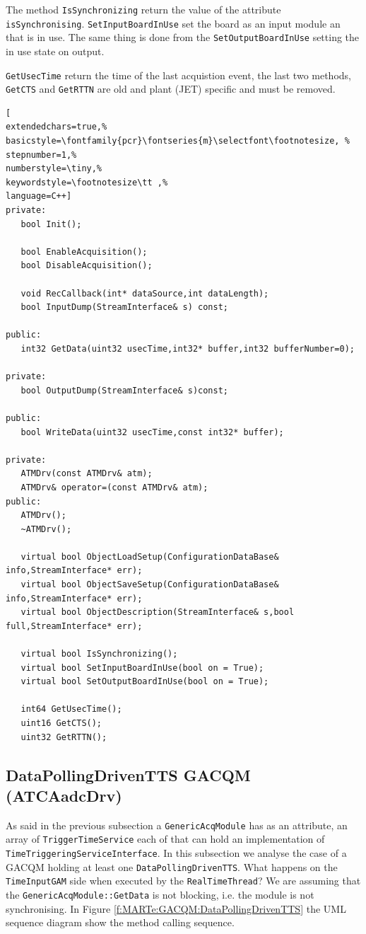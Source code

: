 The method \texttt{IsSynchronizing} return the value of the attribute \texttt{isSynchronising}. \texttt{SetInputBoardInUse} set the board as an input module an that is in use. The same thing is done from the \texttt{SetOutputBoardInUse} setting the in use state on output. 

\texttt{GetUsecTime} return the time of the last acquistion event, the last two methods, \texttt{GetCTS} and \texttt{GetRTTN} are old and plant (JET) specific and must be removed.

\begin{lstlisting}[
extendedchars=true,%
basicstyle=\fontfamily{pcr}\fontseries{m}\selectfont\footnotesize, %
stepnumber=1,%
numberstyle=\tiny,%
keywordstyle=\footnotesize\tt ,%
language=C++]
private:
   bool Init();

   bool EnableAcquisition();
   bool DisableAcquisition();

   void RecCallback(int* dataSource,int dataLength);
   bool InputDump(StreamInterface& s) const;

public:
   int32 GetData(uint32 usecTime,int32* buffer,int32 bufferNumber=0);

private:
   bool OutputDump(StreamInterface& s)const;

public:
   bool WriteData(uint32 usecTime,const int32* buffer);

private:
   ATMDrv(const ATMDrv& atm);
   ATMDrv& operator=(const ATMDrv& atm);
public:
   ATMDrv();
   ~ATMDrv();

   virtual bool ObjectLoadSetup(ConfigurationDataBase& info,StreamInterface* err);
   virtual bool ObjectSaveSetup(ConfigurationDataBase& info,StreamInterface* err);
   virtual bool ObjectDescription(StreamInterface& s,bool full,StreamInterface* err);

   virtual bool IsSynchronizing();
   virtual bool SetInputBoardInUse(bool on = True);
   virtual bool SetOutputBoardInUse(bool on = True);

   int64 GetUsecTime();
   uint16 GetCTS();
   uint32 GetRTTN();
\end{lstlisting}



\subsection{DataPollingDrivenTTS GACQM (ATCAadcDrv)}
As said in the previous subsection a \texttt{GenericAcqModule} has as an attribute, an array of \texttt{TriggerTimeService} each of that can hold an implementation of \texttt{TimeTriggeringServiceInterface}. In this subsection we analyse the case of a GACQM holding at least one \texttt{DataPollingDrivenTTS}.
What happens on the \texttt{TimeInputGAM} side when executed by the \texttt{RealTimeThread}? We are assuming that the \texttt{GenericAcqModule::GetData} is not blocking, i.e. the module is not synchronising. In Figure \ref{f:MARTe:GACQM:DataPollingDrivenTTS} the UML sequence diagram show the method calling sequence.

